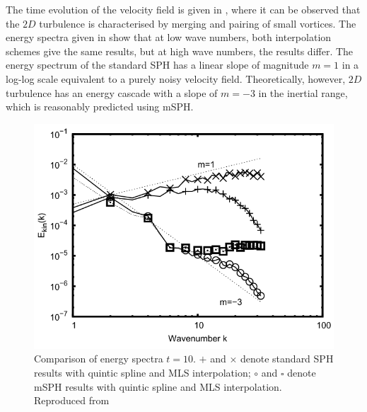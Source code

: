 The time evolution of the velocity field is given in , where it can be observed that the $2D$ turbulence is characterised by merging and pairing of small vortices. The energy spectra given in  show that at low wave numbers, both interpolation schemes give the same results, but at high wave numbers, the results differ. The energy spectrum of the standard SPH has a linear slope of magnitude $m = 1$ in a log-log scale equivalent to a purely noisy velocity field. Theoretically, however, $2D$ turbulence has an energy cascade with a slope of $m = -3$ in the inertial range, which is reasonably predicted using mSPH.
\begin{figure}[htbp!]
    \centering
    \includegraphics[scale=0.55]{Figures/research_papers/adami2012-energy-spectra-tgv.png}
    \caption{Comparison of energy spectra $t=10$. $+$ and $\times$ denote standard SPH results with quintic spline and MLS interpolation; $\circ$ and $\square$ denote mSPH results with quintic spline and MLS interpolation. Reproduced from \cite{Adami2012} }
    \label{fig:adami2012-energy-spectra-tgv}
\end{figure}

